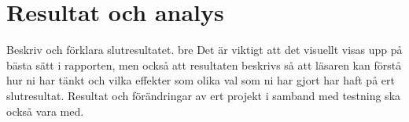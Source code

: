 \section{Resultat och analys}
Beskriv och förklara slutresultatet. bre Det är viktigt att det visuellt visas upp på bästa sätt i rapporten, men också att resultaten beskrivs så att läsaren kan förstå hur ni har tänkt och vilka effekter som olika val som ni har gjort har haft på ert slutresultat. Resultat och förändringar av ert projekt i samband med testning ska också vara med.